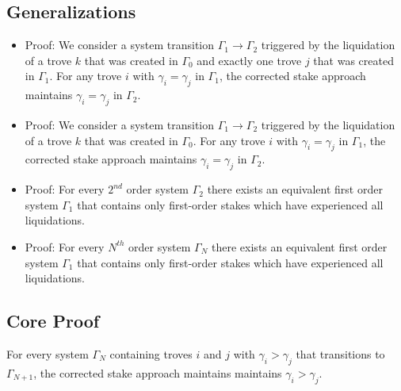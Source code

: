 \documentclass[reqno]{article}
\begin{document}
\subsection*{Generalizations}
\begin{itemize}
  
  \item Proof: We consider a system transition $\Gamma_1 \rightarrow \Gamma_2$ triggered by the liquidation of a trove $k$ that was created in $\Gamma_0$ and exactly one trove $j$ that was created in $\Gamma_1$. For any trove $i$ with $\gamma_i = \gamma_j$ in $\Gamma_1$, the corrected stake approach maintains $\gamma_i = \gamma_j$ in $\Gamma_2$.
  
  
  \item Proof: We consider a system transition $\Gamma_1 \rightarrow \Gamma_2$ triggered by the liquidation of a trove $k$ that was created in $\Gamma_0$. For any trove $i$ with $\gamma_i = \gamma_j$ in $\Gamma_1$, the corrected stake approach maintains $\gamma_i = \gamma_j$ in $\Gamma_2$.
  
  \item Proof: For every $2^{nd}$ order system $\Gamma_2$ there exists an equivalent first order system $\Gamma_1$ that contains only first-order stakes which have experienced all liquidations.
  
  \item Proof: For every $N^{th}$ order system $\Gamma_N$ there exists an equivalent first order system $\Gamma_1$ that contains only first-order stakes which have experienced all liquidations.
    
  
\end{itemize}

\subsection*{Core Proof}
For every system $\Gamma_N$ containing troves $i$ and $j$ with $\gamma_i > \gamma_j$ that transitions to $\Gamma_{N+1}$, the corrected stake approach maintains maintains $\gamma_i > \gamma_j$.
\end{document}
